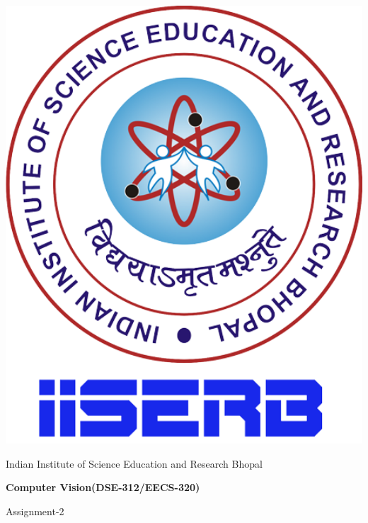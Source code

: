 \documentclass[12pt, a4paper]{exam}
\begin{document}
	\noindent
	\begin{minipage}[l]{0.1\textwidth}
		\noindent
		\includegraphics[width=1.8\textwidth]{res/iiserb_logo.png}
	\end{minipage}
\hfill
\begin{minipage}[c]{0.8\textwidth}
	\begin{center}
		{\large	Indian Institute of Science Education and Research Bhopal \par
		\large	\par
	\large \textbf{	Computer Vision(DSE-312/EECS-320)}	\par
\small	Assignment-2}
	\end{center}
\end{minipage}
\end{document}
